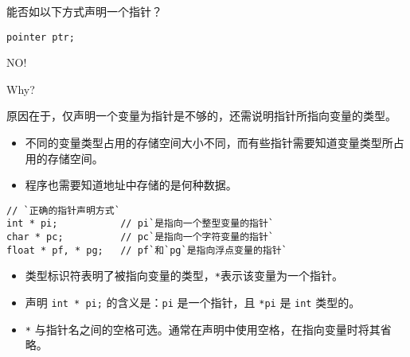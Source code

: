 \begin{frame}[fragile]
能否如以下方式声明一个指针？
\begin{lstlisting}[backgroundcolor=\color{blue!10}]
pointer ptr;
\end{lstlisting}
\pause \vspace{0.1in}

\begin{center}
{\Large NO!}
\end{center}
\pause\vspace{0.1in}

\begin{center}
{\Large Why?} 
\end{center}
\end{frame}

\begin{frame}[fragile]
原因在于，仅声明一个变量为指针是不够的，还需说明指针所指向变量的类型。
\vspace{0.1in}

\begin{itemize}
\item 不同的变量类型占用的存储空间大小不同，而有些指针需要知道变量类型所占用的存储空间。\\[0.1in]
\item 程序也需要知道地址中存储的是何种数据。
\end{itemize}
\end{frame}

\begin{frame}[fragile]
  \begin{lstlisting}[backgroundcolor=\color{blue!10}]
// `正确的指针声明方式`    
int * pi;           // pi`是指向一个整型变量的指针`
char * pc;          // pc`是指向一个字符变量的指针`
float * pf, * pg;   // pf`和`pg`是指向浮点变量的指针`
\end{lstlisting} \pause \vspace{0.1in}

\begin{itemize}
\item
类型标识符表明了被指向变量的类型，\lstinline|*|表示该变量为一个指针。\\[0.1in]
\item 
声明 \lstinline|int * pi;| 的含义是：\lstinline|pi| 是一个指针，且 \lstinline|*pi| 是 \lstinline|int| 类型的。\\[0.1in]
\item 
\lstinline|*| 与指针名之间的空格可选。通常在声明中使用空格，在指向变量时将其省略。
\end{itemize}
\end{frame}

